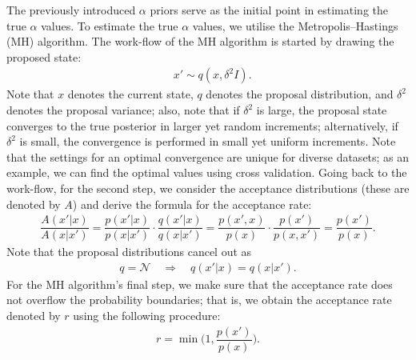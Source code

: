 \documentclass{mpaper}
\begin{document}
\par The previously introduced $\alpha$ priors serve as the initial point in estimating the true $\alpha$ values. To estimate the true $\alpha$ values, we utilise the Metropolis--Hastings (MH) algorithm. The work-flow of the MH algorithm is started by drawing the proposed state:
\begin{align*}
&x' \sim q(x,\delta^2I).
\end{align*}
Note that $x$ denotes the current state, $q$ denotes the proposal distribution, and $\delta^2$ denotes the proposal variance; also, note that if $\delta^2$ is large, the proposal state converges to the true posterior in larger yet random increments; alternatively, if $\delta^2$ is small, the convergence is performed in small yet uniform increments. Note that the settings for an optimal convergence are unique for diverse datasets; as an example, we can find the optimal values using cross validation. Going back to the work-flow, for the second step, we consider the acceptance distributions (these are denoted by $A$) and derive the formula for the acceptance rate:
\begin{align*}
  \dfrac{A(x'|x)}{A(x|x')} = \dfrac{p(x'|x)}{p(x|x')}\cdot \dfrac{q(x'|x)}{q(x|x')} = \dfrac{p(x',x)}{p(x)}\cdot \dfrac{p(x')}{p(x,x')} = \dfrac{p(x')}{p(x)}.
\end{align*}
Note that the proposal distributions cancel out as
\begin{align*}
q = \mathcal{N} \quad \Longrightarrow \quad q(x'|x) = q(x|x').
\end{align*}
For the MH algorithm's final step, we make sure that the acceptance rate does not overflow the probability boundaries; that is, we obtain the acceptance rate denoted by $r$ using the following procedure:
\begin{align*}
  r = \min{\bigg(1, \dfrac{p(x')}{p(x)}\bigg)}.
\end{align*}
\end{document}
